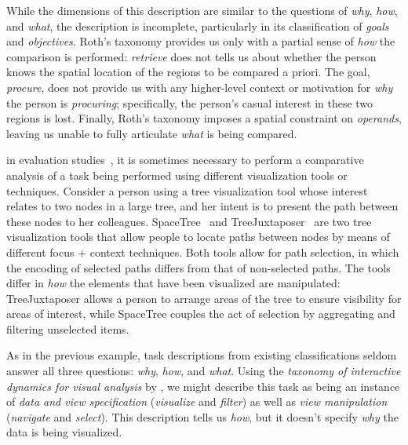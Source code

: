While the dimensions of this description are similar to the questions of {\it why}, {\it how}, and {\it what}, the description is incomplete, particularly in its classification of {\it goals} and {\it objectives}.
Roth's taxonomy provides us only with a partial sense of {\it how} the comparison is performed: {\it retrieve} does not tells us about whether the person knows the spatial location of the regions to be compared a priori.
The goal, {\it procure}, does not provide us with any higher-level context or motivation for {\it why} the person is {\it procuring}; specifically, the person's casual interest in these two regions is lost.
Finally, Roth's taxonomy imposes a spatial constraint on {\it operands}, leaving us unable to fully articulate {\it what} is being compared.

 in evaluation studies~\cite{Lam2012}, it is sometimes necessary to perform a comparative analysis of a task being performed using different visualization tools or techniques.
Consider a person using a tree visualization tool whose interest relates to two nodes in a large tree, and her intent is to present the path between these nodes to her colleagues.
SpaceTree~\cite{Grosjean2002} and TreeJuxtaposer~\cite{Munzner2003} are two tree visualization tools that allow people to locate paths between nodes by means of different focus + context techniques.
Both tools allow for path selection, in which the encoding of selected paths differs from that of non-selected paths.
The tools differ in {\it how} the elements that have been visualized are manipulated:
TreeJuxtaposer allows a person to arrange areas of the tree to ensure visibility for areas of interest, while SpaceTree couples the act of selection by aggregating and filtering unselected items.

As in the previous example, task descriptions from existing classifications seldom answer all three questions: {\it why}, {\it how}, and {\it what}.
Using the {\it taxonomy of interactive dynamics for visual analysis} by \citet{Heer2012}, we might describe this task as being an instance of {\it data and view specification} ({\it visualize} and {\it filter}) as well as
{\it view manipulation} ({\it navigate} and {\it select}).
This description tells us {\it how}, but it doesn't specify {\it why} the data is being visualized.

